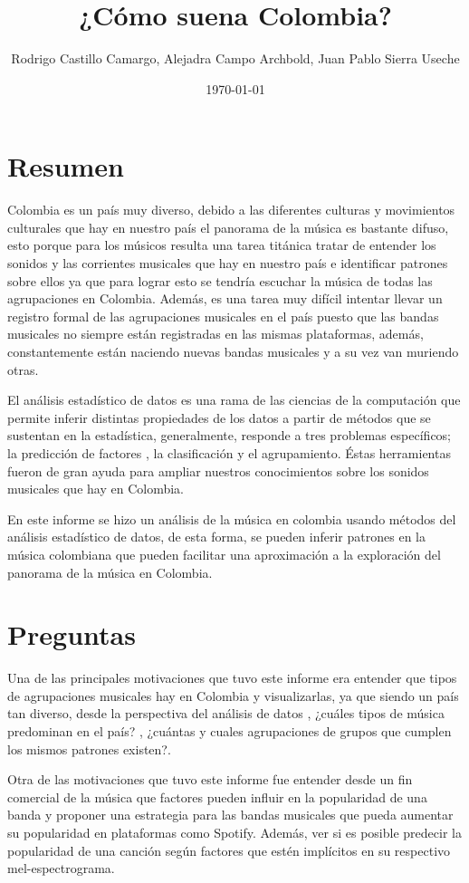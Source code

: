 \documentclass[11pt]{article}
\author{Rodrigo Castillo Camargo, Alejadra Campo Archbold, Juan Pablo Sierra Useche}
\date{\today}
\title{¿Cómo suena Colombia?}
\begin{document}
\maketitle

\section{Resumen}
\label{sec:org6bf1105}
Colombia es un país muy diverso, debido a las diferentes culturas y movimientos
culturales que hay en nuestro país el panorama de la música es bastante difuso,
esto porque para los músicos resulta una tarea titánica tratar de entender los
sonidos y las corrientes musicales que hay en nuestro país e identificar
patrones sobre ellos ya que para lograr esto se tendría escuchar la música de
todas las agrupaciones en Colombia. Además, es una tarea muy difícil intentar
llevar un registro formal de las agrupaciones musicales en el país puesto que
las bandas musicales no siempre están registradas en las mismas plataformas,
además, constantemente están naciendo nuevas bandas musicales y a su vez van
muriendo otras.

El análisis estadístico de datos es una rama de las ciencias de la computación
que permite inferir distintas propiedades de los datos a partir de métodos que
se sustentan en la estadística, generalmente, responde a tres problemas
específicos; la predicción  de factores , la clasificación y el agrupamiento.
Éstas herramientas fueron de gran ayuda para ampliar nuestros conocimientos
sobre los sonidos musicales que hay en Colombia.

En este informe se hizo un análisis de la música en colombia usando métodos del
análisis estadístico de datos, de esta forma, se pueden inferir patrones en la
música colombiana que pueden facilitar una aproximación a la exploración del
panorama de la música en Colombia.

\section{Preguntas}
\label{sec:org2b99a4f}
Una de las principales motivaciones que tuvo este informe era entender que tipos
de agrupaciones musicales hay en Colombia y visualizarlas, ya que siendo un país
tan diverso, desde la perspectiva del análisis de datos , ¿cuáles tipos de
música predominan en el país? , ¿cuántas y cuales agrupaciones de grupos que
cumplen los mismos patrones existen?.

Otra de las motivaciones que tuvo este informe fue entender desde un fin
comercial de la música que factores pueden influir en la popularidad de una
banda y proponer una estrategia para las bandas musicales que pueda aumentar su
popularidad en plataformas como Spotify. Además, ver si es posible predecir la
popularidad de una canción según factores que estén implícitos en su respectivo
mel-espectrograma.
\end{document}
